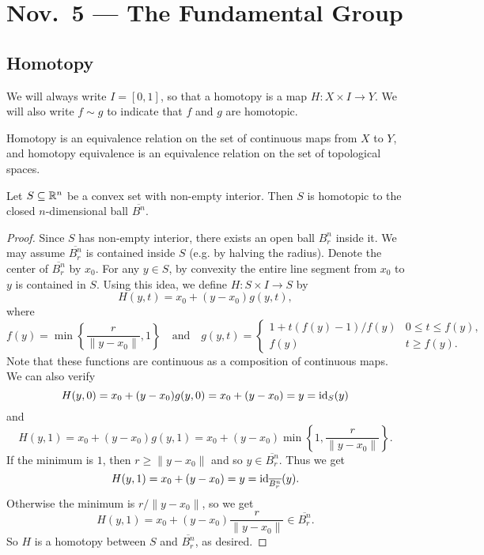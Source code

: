 \chapter{Nov.~5 --- The Fundamental Group}

\section{Homotopy}
\begin{remark}
  We will always write $I = [0, 1]$, so that a
  homotopy is a map $H : X \times I \to Y$. We will
  also write $f \sim g$ to indicate that $f$ and
  $g$ are homotopic.
\end{remark}

\begin{remark}
  Homotopy is an equivalence relation on the set of
  continuous maps from $X$ to $Y$, and homotopy
  equivalence is an equivalence relation on the set
  of topological spaces.
\end{remark}

\begin{prop}
  Let $S \subseteq \mathbb{R}^n$ be a convex set with
  non-empty interior. Then $S$ is homotopic to the
  closed $n$-dimensional ball $\overline{B^n}$.
\end{prop}

\begin{proof}
  Since $S$ has non-empty interior, there exists
  an open ball $B_r^n$ inside it. We may assume
  $\overline{B_r^n}$ is contained inside $S$ (e.g. by
  halving the radius). Denote the center of $\overline{B_r^n}$
  by $x_0$. For any $y \in S$, by convexity the
  entire line segment from $x_0$ to $y$ is contained
  in $S$. Using this idea, we
  define $H : S \times I \to S$ by
  \[
    H(y, t) =
      x_0 + (y - x_0)g(y, t),
  \]
  where
  \[
    f(y) = \min\left\{\frac{r}{\|y - x_0\|}, 1\right\}
    \quad\text{and}\quad
    g(y, t) = \begin{cases}
      1 + t(f(y) - 1) / f(y) & 0 \le t \le f(y), \\
      f(y) & t \ge f(y).
    \end{cases}
  \]
  Note that these
  functions are continuous as a composition
  of continuous maps. We can also verify
  \[
    H(y, 0) = x_0 + (y - x_0) g(y, 0) = x_0 + (y - x_0) =
    y = \operatorname{id}_S(y)
  \]
  and
  \[
    H(y, 1) = x_0 + (y - x_0) g(y, 1)
    = x_0 + (y - x_0) \min\left\{1, \frac{r}{\|y - x_0\|}\right\}.
  \]
  If the minimum is $1$, then $r \ge \|y - x_0\|$
  and so $y \in \overline{B^n_r}$. Thus we get
  \[
    H(y, 1) = x_0 + (y - x_0) = y = \operatorname{id}_{\overline{B_r^n}}(y).
  \]
  Otherwise the minimum is $r / \|y - x_0\|$, so
  we get
  \[
    H(y, 1) = x_0 + (y - x_0) \frac{r}{\|y - x_0\|} \in \overline{B^n_r}.
  \]
  So $H$ is a homotopy between $S$ and $\overline{B_r^n}$, as desired.
\end{proof}

